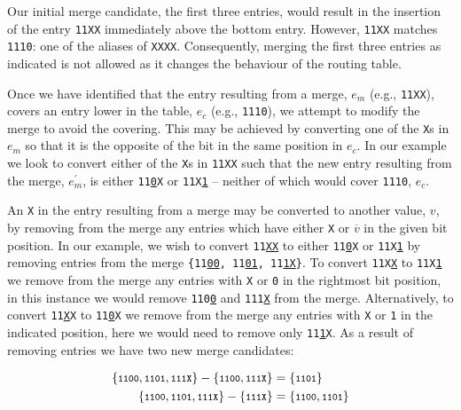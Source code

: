 \documentclass[conference]{IEEEtran}
\newcommand{\mytt}[1]{\texttt{\footnotesize#1}}
\begin{document}
  \noindent Our initial merge candidate, the first three entries, would result in the insertion of the entry \mytt{11XX} immediately above the bottom entry.
  However, \mytt{11XX} matches \mytt{1110}: one of the aliases of \mytt{XXXX}.
  Consequently, merging the first three entries as indicated is not allowed as it changes the behaviour of the routing table.

  Once we have identified that the entry resulting from a merge, $e_m$ (e.g., \mytt{11XX}), covers an entry lower in the table, $e_c$ (e.g., \mytt{1110}), we attempt to modify the merge to avoid the covering.
  This may be achieved by converting one of the \mytt{X}s in $e_m$ so that it is the opposite of the bit in the same position in $e_c$.
  In our example we look to convert either of the \mytt{X}s in \mytt{11XX} such that the new entry resulting from the merge, $e_m^\prime$, is either \mytt{11\underline{0}X} or \mytt{11X\underline{1}} -- neither of which would cover \mytt{1110}, $e_c$.
  
  An \mytt{X} in the entry resulting from a merge may be converted to another value, $v$, by removing from the merge any entries which have either \mytt{X} or $\overline{v}$ in the given bit position.
  In our example, we wish to convert \mytt{11\underline{XX}} to either \mytt{11\underline{0}X} or \mytt{11X\underline{1}} by removing entries from the merge \mytt{\{11\underline{00}, 11\underline{01}, 11\underline{1X}\}}.
  To convert \mytt{11X\underline{X}} to \mytt{11X\underline{1}} we remove from the merge any entries with \mytt{X} or \mytt{0} in the rightmost bit position, in this instance we would remove \mytt{110\underline{0}} and \mytt{111\underline{X}} from the merge.
  Alternatively, to convert \mytt{11\underline{X}X} to \mytt{11\underline{0}X} we remove from the merge any entries with \mytt{X} or \mytt{1} in the indicated position, here we would need to remove only \mytt{11\underline{1}X}.
  As a result of removing entries we have two new merge candidates:\nopagebreak
  
  \begin{align*}
    \{\mbox{\mytt{1100}}, \mbox{\mytt{1101}}, \mbox{\mytt{111X}}\} -
    \{\mbox{\mytt{1100}}, \mbox{\mytt{111X}}\} &= \{\mbox{\mytt{1101}}\} \\
    \{\mbox{\mytt{1100}}, \mbox{\mytt{1101}}, \mbox{\mytt{111X}}\} -
    \{\mbox{\mytt{111X}}\} &= \{\mbox{\mytt{1100}}, \mbox{\mytt{1101}}\}
  \end{align*}
  
\end{document}

